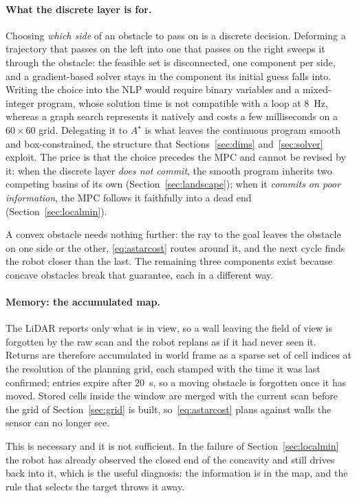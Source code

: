 \documentclass[11pt,a4paper]{article}
\newcommand{\astar}{$A^\star$}
\begin{document}
\paragraph{What the discrete layer is for.} Choosing \emph{which side} of an obstacle to pass on is a
discrete decision. Deforming a trajectory that passes on the left into one that passes on the right
sweeps it through the obstacle: the feasible set is disconnected, one component per side, and a
gradient-based solver stays in the component its initial guess falls into. Writing the choice into the NLP would require
binary variables and a mixed-integer program, whose solution time is not compatible with a loop at $8$~Hz,
whereas a graph search represents it natively and costs a few milliseconds on a $60\times60$ grid.
Delegating it to \astar{} is what leaves the continuous program smooth and box-constrained, the structure
that Sections~\ref{sec:dims} and~\ref{sec:solver} exploit. The price is that the choice precedes the MPC and cannot be revised by it: when the discrete
layer \emph{does not commit}, the smooth program inherits two competing basins of its own
(Section~\ref{sec:landscape}); when it \emph{commits on poor information}, the MPC follows it faithfully
into a dead end (Section~\ref{sec:localmin}).

A convex obstacle needs nothing further: the ray to the goal leaves the obstacle on one side or the other,
\eqref{eq:astarcost} routes around it, and the next cycle finds the robot closer than the last. The
remaining three components exist because concave obstacles break that guarantee, each in a different way.

\paragraph{Memory: the accumulated map.} The LiDAR reports only what is in view, so a wall leaving the
field of view is forgotten by the raw scan and the robot replans as if it had never seen it. Returns are
therefore accumulated in world frame as a sparse set of cell indices at the resolution of the planning
grid, each stamped with the time it was last confirmed; entries expire after $20$~s, so a moving obstacle
is forgotten once it has moved. Stored cells inside the window are merged with the current scan before the
grid of Section~\ref{sec:grid} is built, so~\eqref{eq:astarcost} plans against walls the sensor can no
longer see.

This is necessary and it is not sufficient. In the failure of Section~\ref{sec:localmin} the robot has
already observed the closed end of the concavity and still drives back into it, which is the useful
diagnosis: the information is in the map, and the rule that selects the target throws it away.
\end{document}
